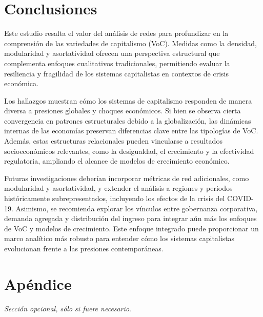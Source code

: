 \documentclass[12pt]{article}
\begin{document}
\lipsum

\section{Conclusiones}
Este estudio resalta el valor del análisis de redes para profundizar en la comprensión de las variedades de capitalismo (VoC). Medidas como la densidad, modularidad y asortatividad ofrecen una perspectiva estructural que complementa enfoques cualitativos tradicionales, permitiendo evaluar la resiliencia y fragilidad de los sistemas capitalistas en contextos de crisis económica.

Los hallazgos muestran cómo los sistemas de capitalismo responden de manera diversa a presiones globales y choques económicos. Si bien se observa cierta convergencia en patrones estructurales debido a la globalización, las dinámicas internas de las economías preservan diferencias clave entre las tipologías de VoC. Además, estas estructuras relacionales pueden vincularse a resultados socioeconómicos relevantes, como la desigualdad, el crecimiento y la efectividad regulatoria, ampliando el alcance de modelos de crecimiento económico.

Futuras investigaciones deberían incorporar métricas de red adicionales, como modularidad y asortatividad, y extender el análisis a regiones y periodos históricamente subrepresentados, incluyendo los efectos de la crisis del COVID-19. Asimismo, se recomienda explorar los vínculos entre gobernanza corporativa, demanda agregada y distribución del ingreso para integrar aún más los enfoques de VoC y modelos de crecimiento. Este enfoque integrado puede proporcionar un marco analítico más robusto para entender cómo los sistemas capitalistas evolucionan frente a las presiones contemporáneas.

%
\printbibliography
\newpage
\section{Apéndice}


\textit{Sección opcional, sólo si fuere necesario}.
\end{document}
